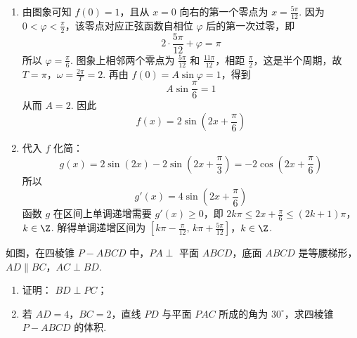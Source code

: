 \begin{solution}
\begin{enumerate}
\item 由图象可知 \(f(0)=1\)，且从 \(x=0\) 向右的第一个零点为
\(x=\frac{5\pi}{12}\). 因为 \(0<\varphi<\frac{\pi}{2}\)，该零点对应正弦函数自相位
\(\varphi\) 后的第一次过零，即
\[
2\cdot\frac{5\pi}{12}+\varphi=\pi
\]
所以 \(\varphi=\frac{\pi}{6}\). 图象上相邻两个零点为
\(\frac{5\pi}{12}\) 和 \(\frac{11\pi}{12}\)，相距 \(\frac{\pi}{2}\)，这是半个周期，故
\(T=\pi\)，\(\omega=\frac{2\pi}{T}=2\).
再由 \(f(0)=A\sin\varphi=1\)，得到
\[
A\sin\frac{\pi}{6}=1
\]
从而 \(A=2\). 因此
\[
f(x)=2\sin\left(2x+\frac{\pi}{6}\right)
\]
\item 代入 \(f\) 化简：
\[
g(x)=2\sin\left(2x\right)-2\sin\left(2x+\frac{\pi}{3}\right)
=-2\cos\left(2x+\frac{\pi}{6}\right)
\]
所以
\[
g'(x)=4\sin\left(2x+\frac{\pi}{6}\right)
\]
函数 \(g\) 在区间上单调递增需要 \(g'(x)\geqslant0\)，即
\(2k\pi\leqslant2x+\frac{\pi}{6}\leqslant(2k+1)\pi\)，\(k\in\Z\).
解得单调递增区间为
\(\left[k\pi-\frac{\pi}{12},\,k\pi+\frac{5\pi}{12}\right]\)，\(k\in\Z\).
\end{enumerate}
\end{solution}

\begin{problem}
如图，在四棱锥 \(P - ABCD\) 中，\(PA \perp\) 平面 \(ABCD\)，底面 \(ABCD\) 是等腰梯形，\(AD\parallel BC\)，\(AC \perp BD\).

\begin{enumerate}
\item 证明： \(BD \perp PC\)；
\item 若 \(AD=4\)，\(BC=2\)，直线 \(PD\) 与平面 \(PAC\) 所成的角为 \(30^{\circ}\)，求四棱锥 \(P-ABCD\) 的体积.
\end{enumerate}

\end{problem}

